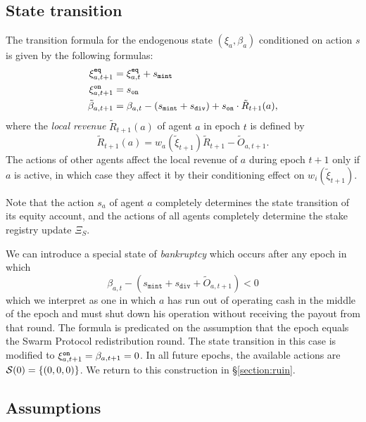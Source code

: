 \subsection{State transition}
The transition formula for the endogenous state $(\xi_a,\beta_a)$ conditioned on action $s$ is given by the following formulas:
\begin{align*}
  \xi^{\mathtt{eq}}_{a,t+1} &= \xi^{\mathtt{eq}}_{a,t} + s_\mathtt{mint} \\
  \xi^{\mathtt{on}}_{a,t+1} &= s_\mathtt{on} \\
  \tilde\beta_{a,t+1} &= \beta_{a,t} - (s_\mathtt{mint} + s_\mathtt{div}) + s_{\mathtt{on}} \cdot \tilde{R}_{t+1}(a),
\end{align*}
%
where the \emph{local revenue} $\tilde{R}_{t+1}(a)$ of agent $a$ in epoch $t$ is defined by
%
\[
  \tilde{R}_{t+1}(a) = w_a(\tilde{\xi}_{t+1})\tilde{R}_{t+1} - \tilde{O}_{a,t+1}.
\]
%
The actions of other agents affect the local revenue of $a$ during epoch $t+1$ only if $a$ is active, in which case they affect it by their conditioning effect on $w_i(\tilde{\xi}_{t+1})$.

Note that the action $s_a$ of agent $a$ completely determines the state transition of its equity account, and the actions of all agents completely determine the stake registry update $\Xi_S$.

\begin{remark}[Ruin]

  We can introduce a special state of \emph{bankruptcy} which occurs after any epoch in which 
  \[
    \beta_{a,t} - (s_\mathtt{mint} + s_\mathtt{div} + \tilde{O}_{a,t+1})<0
  \]
  which we interpret as one in which $a$ has run out of operating cash in the middle of the epoch and must shut down his operation without receiving the payout from that round.
  The formula is predicated on the assumption that the epoch equals the Swarm Protocol redistribution round.
  The state transition in this case is modified to $\xi^{\mathtt{on}}_{a,t+1} = \beta_{a,t+1}=0$.
  In all future epochs, the available actions are $\mathcal{S}(0)=\{(0,0,0)\}$.
  We return to this construction in \S\ref{section:ruin}.

\end{remark}




\subsection{Assumptions}
\label{section:assumptions}

